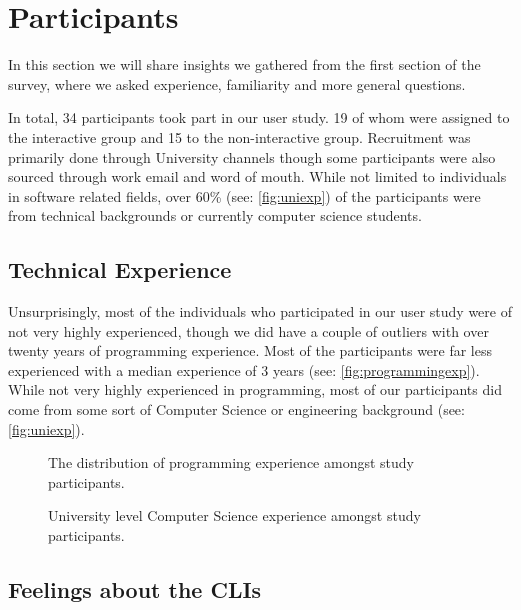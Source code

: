 \section{Participants}

In this section we will share insights we gathered from the first section of
the survey, where we asked experience, familiarity and more general questions.

In total, 34 participants took part in our user study. 19 of whom were assigned
to the interactive group and 15 to the non-interactive group. Recruitment was
primarily done through University channels though some participants were also
sourced through work email and word of mouth. While not limited to individuals
in software related fields, over 60\% (see: \autoref{fig:uniexp}) of the
participants were from technical backgrounds or currently computer science
students.

\subsection{Technical Experience}

Unsurprisingly, most of the individuals who participated in our user study were
of not very highly experienced, though we did have a couple of outliers with
over twenty years of programming experience. Most of the participants were far
less experienced with a median experience of 3 years (see:
\autoref{fig:programmingexp}). While not very highly experienced in
programming, most of our participants did come from some sort of Computer
Science or engineering background (see: \autoref{fig:uniexp}).


\begin{figure}[htbp]
	\centering
	\scalebox{0.75}{}
	\caption{The distribution of programming experience amongst study participants.}
	\label{fig:programmingexp}
\end{figure}

\begin{figure}[htbp]
	\centering
	\scalebox{0.8}{}
	\caption{University level Computer Science experience amongst study participants.}
	\label{fig:uniexp}
\end{figure}

\FloatBarrier


\subsection{Feelings about the CLIs}

